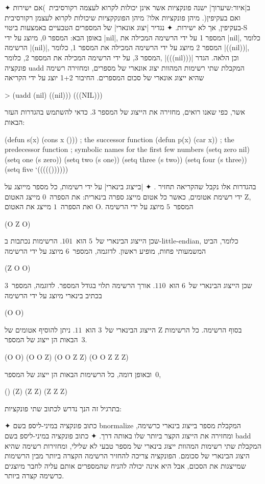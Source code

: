 \begin{enumerate}
  ✦ ב|איור:שיערוך| ישנה פונקציות אשר אינן יכולות לקרוא לעצמה
  רקורסיבית~)אם ישירות ואם בעקיפין(. מיהן פונקציות אלו? מיהן
  הפונקקציות שיכולות לקרוא לעצמן רקורסיבית בעקיפין, אך לא ישירות.
  ✦ נגדיר
  \ע|יצוג אונארי| של המספרים הטבעיים באמצעות ביטוי-S באופן הבא: המספר
  0,
  מיוצג על ידי \E|nil|, המספר 1 על ידי הרשימה המכילה את \E|nil|, כלומר הרשימה
  \E|(nil)|, המספר 2 מיוצג על ידי הרשימה המכילה את המספר 1, כלומר \E|((nil))|,
  המספר 3, על ידי הרשימה המכילה את המספר 2, כלומר, \E|(((nil)))| וכן הלאה.
  הגדר פונקציה uadd המקבלת שתי רשימות המהוות יצוג אונארי של מספרים, ומחזירה
  רשימה שהיא ייצוג אונארי של סכום המספרים. החיבור 1+2 יוצג על ידי הקריאה
  \begin{LISP}
> (uadd (nil) ((nil)))
(((NIL)))
\end{LISP}
  אשר, כפי שאנו רואים, מחזירה את הייצוג של המספר 3.
  כדאי להשתמש בהגדרות העזר הבאות:
  \begin{LISP}
(defun s(x) (cons x ())) ; the successor function
(defun p(x) (car x)) ; the predecessor function
; symbolic names for the first few numbers
(setq zero nil)
(setq one (s zero))
(setq two (s one))
(setq three (s two))
(setq four (s three))
(setq five ‘((((())))))
\end{LISP}
  בהגדרות אלו נקבל שהקריאה
  תחזיר \lisp{((((()))))}.
  ✦ \ע|בייצוג בינארי| על ידי רשימות, כל מספר מייוצג על ידי רשימת אטומים, כאשר כל
  אטום מייצג ספרה בינארית: את הספרה~$0$ מייצג האטום Z, ואת הספרה~$1$ מייצג את
  האטום O. המספר~$5$ מיוצג על ידי הרשימה \begin{LISP}
(O Z O)
\end{LISP} שכן הייצוג הבינארי של~$5$ הוא~$101$. הרשימות נכתבות ב-little-endian,
  כלומר, הביט המשמעותי פחות, מופיע ראשון. לדוגמה, המספר~$6$ מיוצג על ידי הרשימה
  \begin{LISP}
 (Z O O)
 \end{LISP} שכן הייצוג הבינארי של~$6$ הוא~$110$. אורך הרשימה תלוי בגודל המספר.
  לדוגמה, המספר~$3$ בכתיב בינארי מיוצג על ידי הרשימה \begin{LISP}
 (O O)
 \end{LISP} הייצוג הבינארי של~$3$ הוא~$11$. ניתן להוסיף אטומים של Z בסוף
  הרשימה. כל הרשימות הבאות הן ייצוג של המספר~$3$. \begin{LISP}
(O O)
(O O Z)
(O O Z Z)
(O O Z Z Z)
\end{LISP}
  ובאופן דומה, כל הרשימות הבאות הן ייצוג של המספר~$0$,
  \begin{LISP}
()
(Z)
(Z Z)
(Z Z Z)
\end{LISP}
  בתרגיל זה הנך נדרש לכתוב שתי פונקציות:
  \begin{itemize}
    ✦ כתוב פונקציה במיני-ליספ בשם bnormalize המקבלת מספר בייצוג בינארי כרשימה,
    ומחזירה את הייצוג הקצר ביותר שלו באותה דרך.
    ✦ כתוב פונקציה במיני-ליספ בשם badd המקבלת שתי רשימות המהוות ייצוג בינארי
    של מספר טבעי לא שלילי, ומחזירות רשימה שהיא היצוג הבינארי של סכומם.
    הפונקציה צריכה להחזיר הרשימה הקצרה ביותר מבין הרשימות שמייצגות את הסכום,
    אבל היא אינה יכולה להניח שהמספרים אותם עליה לחבר מיוצגים כרשימה קצרה
    ביותר.
  \end{itemize}
\end{enumerate}
